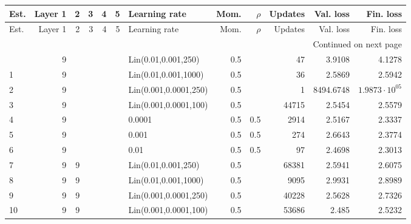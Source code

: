 \begin{longtable}{lrrrrrlrrrrr}
\label{tab:Full_results}\\
\toprule
Est. & Layer 1 & 2 & 3 & 4 & 5 &         Learning rate & Mom. & $\rho$ & Updates &              Val. loss &             Fin. loss \\
\midrule
\endfirsthead

\toprule
Est. & Layer 1 & 2 & 3 & 4 & 5 &         Learning rate & Mom. & $\rho$ & Updates &              Val. loss &             Fin. loss \\
\midrule
\endhead
\midrule
\multicolumn{12}{r}{{Continued on next page}} \\
\midrule
\endfoot

\bottomrule
\endlastfoot
   0 &       9 &   &   &   &   &   Lin(0.01,0.001,250) &  0.5 &        &      47 &                 3.9108 &                4.1278 \\
   1 &       9 &   &   &   &   &  Lin(0.01,0.001,1000) &  0.5 &        &      36 &                 2.5869 &                2.5942 \\
   2 &       9 &   &   &   &   & Lin(0.001,0.0001,250) &  0.5 &        &       1 &              8494.6748 & $1.9873\cdot 10^{05}$ \\
   3 &       9 &   &   &   &   & Lin(0.001,0.0001,100) &  0.5 &        &   44715 &                 2.5454 &                2.5579 \\
   4 &       9 &   &   &   &   &                0.0001 &  0.5 &    0.5 &    2914 &                 2.5167 &                2.3337 \\
   5 &       9 &   &   &   &   &                 0.001 &  0.5 &    0.5 &     274 &                 2.6643 &                2.3774 \\
   6 &       9 &   &   &   &   &                  0.01 &  0.5 &    0.5 &      97 &                 2.4698 &                2.3013 \\
   7 &       9 & 9 &   &   &   &   Lin(0.01,0.001,250) &  0.5 &        &   68381 &                 2.5941 &                2.6075 \\
   8 &       9 & 9 &   &   &   &  Lin(0.01,0.001,1000) &  0.5 &        &    9095 &                 2.9931 &                2.8989 \\
   9 &       9 & 9 &   &   &   & Lin(0.001,0.0001,250) &  0.5 &        &   40228 &                 2.5628 &                2.7326 \\
  10 &       9 & 9 &   &   &   & Lin(0.001,0.0001,100) &  0.5 &        &   53686 &                  2.485 &                2.5232 \\

\end{longtable}
